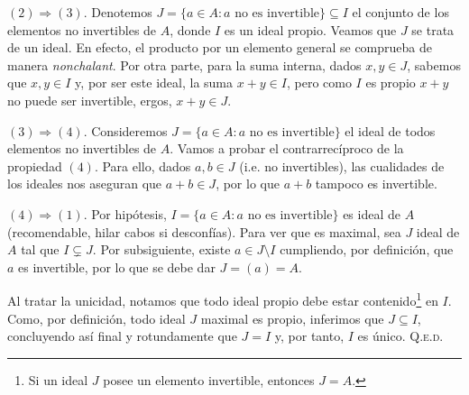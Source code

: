 \documentclass{article}
\begin{document}
\begin{enumerate}
    $(2) \Rightarrow (3)$. Denotemos $J = \{a \in A : a \text{ no es invertible}\} \subseteq I$ el conjunto de los elementos no invertibles de $A$, donde $I$ es un ideal propio. Veamos que $J$ se trata de un ideal. En efecto, el producto por un elemento general se comprueba de manera \textit{nonchalant}. Por otra parte, para la suma interna, dados $x, y \in J$, sabemos que $x, y \in I$ y, por ser este ideal, la suma $x + y \in I$, pero como $I$ es propio $x + y$ no puede ser invertible, ergos, $x + y \in J$.

    $(3) \Rightarrow (4)$. Consideremos $J = \{a \in A : a \text{ no es invertible}\}$ el ideal de todos elementos no invertibles de $A$. Vamos a probar el contrarrecíproco de la propiedad $(4)$. Para ello, dados $a, b \in J$ (i.e. no invertibles), las cualidades de los ideales nos aseguran que $a + b \in J$, por lo que $a + b$ tampoco es invertible.

    $(4) \Rightarrow (1)$. Por hipótesis, $I = \{a \in A : a \text{ no es invertible}\}$ es ideal de $A$ (recomendable, hilar cabos si desconfías). Para ver que es maximal, sea $J$ ideal de $A$ tal que $I \subsetneq J$. Por subsiguiente, existe $a \in J \setminus I$ cumpliendo, por definición, que $a$ es invertible, por lo que se debe dar $J = (a) = A$.

    Al tratar la unicidad, notamos que todo ideal propio debe estar contenido\footnote{Si un ideal $J$ posee un elemento invertible, entonces $J = A$.} en $I$. Como, por definición, todo ideal $J$ maximal es propio, inferimos que $J \subseteq I$, concluyendo así final y rotundamente que $J = I$ y, por tanto, $I$ es único. \hfill{\textsc{Q.e.d.}}
\end{enumerate}
\end{document}
